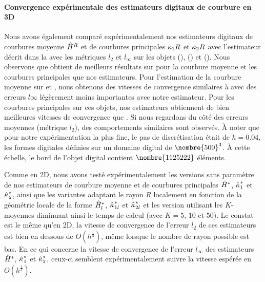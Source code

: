 \paragraph{Convergence expérimentale des estimateurs digitaux de courbure en 3D}
%
Nous avons également comparé expérimentalement nos estimateurs digitaux de
courbures moyenne $\hat{H}^{R}$ et de courbures principales $\kappa_{1}{R}$
et $\kappa_{2}{R}$ avec l'estimateur \JetFitting \cite{Cazals2005} décrit
dans la  avec les métriques $l_2$ et $l_\infty$
sur les objets \Sphere (), \RoundedCube
() et \Goursat
(). Nous observons que \JetFitting
obtient de meilleurs résultats sur \Sphere pour la courbure moyenne et les
courbures principales que nos estimateurs. Pour l'estimation de la courbure
moyenne sur \RoundedCube et \Goursat, nous obtenons des vitesses de convergence
similaires à \JetFitting avec des erreurs $l\infty$ légèrement moins importantes
avec notre estimateur. Pour les courbures principales sur ces objets, nos
estimateurs obtiennent de bien meilleures vitesses de convergence que
\JetFitting. Si nous regardons du côté des erreurs moyennes (métrique $l_2$),
des comportements similaires sont observés. À noter que pour notre
expérimentation la plus fine, le pas de discrétisation était de $h = 0.04$, les
formes digitales définies sur un domaine digital de $\nombre{500}^3$. À cette
échelle, le bord de l'objet digital \RoundedCube contient $\nombre{1125222}$
éléments.


Comme en 2D, nous avons testé expérimentalement les versions sans paramètre de
nos estimateurs de courbure moyenne et de courbures principales $\hat{H}^{*}$,
$\hat{\kappa_{}}_{1}^{*}$ et $\hat{\kappa_{}}_{2}^{*}$, ainsi que les variantes adaptant le
rayon $R$ localement en fonction de la géométrie locale de la forme
$\hat{H}^{*}_{l}$, $\hat{\kappa_{}}_{1l}^{*}$ et $\hat{\kappa_{}}_{2l}^{*}$ et les version
utilisant les $K$-moyennes diminuant ainsi le temps de calcul (avec $K = 5$,
$10$ et $50$). Le constat est le même qu'en 2D, la vitesse de convergence de
l'erreur $l_2$ de ces estimateurs est bien en dessous de $O(h^\frac{1}{3})$,
même lorsque le nombre de rayon possible est bas. En ce qui concerne la vitesse
de convergence de l'erreur $l_\infty$ des estimateurs $\hat{H}^{*}$,
$\hat{\kappa_{}}_{1}^{*}$ et $\hat{\kappa_{}}_{2}^{*}$, ceux-ci semblent expérimentalement
suivre la vitesse espérée en $O(h^\frac{1}{3})$.
%
%
